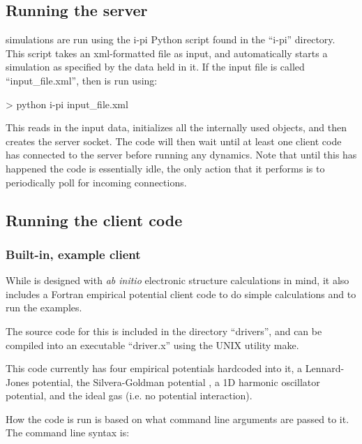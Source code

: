 \documentclass[11pt,english,fleqn]{report}
\newenvironment{code}{%
\footnotesize 
\verbatim
}{
\endverbatim
\normalsize
}
\begin{document}
\subsection{Running the \ipi server}

\label{runningsimulations}

\ipi simulations are run using the i-pi Python script found in the
{}``i-pi'' directory. This script takes an xml-formatted file as
input, and automatically starts a simulation as specified by the data
held in it. If the input file is called {}``input\_file.xml'', then
\ipi is run using:

\begin{code}
> python i-pi input_file.xml
\end{code}

This reads in the input data, initializes all the internally used
objects, and then creates the server socket. The code will then wait
until at least one client code has connected to the server before
running any dynamics. Note that until this has happened the code is
essentially idle, the only action that it performs is to periodically
poll for incoming connections.


\subsection{Running the client code}

\label{runningclients}

\subsubsection{Built-in, example client}

\label{driver.x}

While \ipi is designed with \emph{ab initio} electronic structure calculations
in mind, it also includes a Fortran empirical potential client code to do 
simple calculations and to run the examples.

The source code for this is included in the directory {}``drivers'', and can
be compiled into an executable {}``driver.x'' using the UNIX utility make.

This code currently has four empirical potentials hardcoded into it, 
a Lennard-Jones potential, the Silvera-Goldman potential \cite{silv-gold78jcp},
a 1D harmonic oscillator potential, and the ideal gas (i.e. no potential
interaction).

How the code is run is based on what command line arguments are passed to it.
The command line syntax is:
\end{document}
